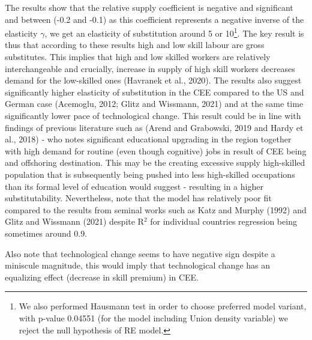 \documentclass{article}
\begin{document}
The results show that the relative supply coefficient is negative and significant and between (-0.2 and -0.1) as this coefficient represents a negative inverse of the elasticity $\gamma$, we get an elasticity of substitution around 5 or 10\footnote{We also performed Hausmann test in order to choose preferred model variant, with p-value 0.04551 (for the model including Union density variable) we reject the null hypothesis of RE model.}. The key result is thus that according to these results high and low skill labour are gross substitutes. This implies that high and low skilled workers are relatively interchangeable and crucially, increase in supply of high skill workers decreases demand for the low-skilled ones (Havranek et al., 2020). The results also suggest significantly higher elasticity of substitution in the CEE compared to the US and German case (Acemoglu, 2012; Glitz and Wissmann, 2021) and at the same time significantly lower pace of technological change. This result could be in line with findings of previous literature such as (Arend and Grabowski, 2019 and Hardy et al., 2018) - who notes significant educational upgrading in the region together with high demand for routine (even though cognitive) jobs in result of CEE being and offshoring destination. This may be the creating excessive supply high-skilled population that is subsequently being pushed into less high-skilled occupations than its formal level of education would suggest - resulting in a higher substitutability.
Nevertheless, note that the model has relatively poor fit compared to the results from seminal works such as Katz and Murphy (1992) and Glitz and Wissmann (2021) despite R$^{2}$ for individual countries regression being sometimes around 0.9.

Also note that technological change seems to have negative sign despite a miniscule magnitude, this would imply that technological change has an equalizing effect (decrease in skill premium) in CEE.


\end{document}
